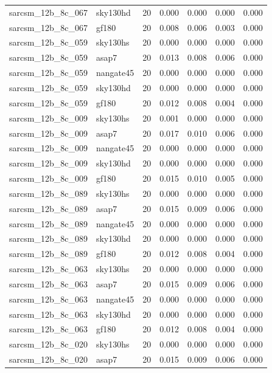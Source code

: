 \begin{tabular}{llrrrrr}
sarcsm\_12b\_8c\_067 & sky130hd & 20 & 0.000 & 0.000 & 0.000 & 0.000 \\
sarcsm\_12b\_8c\_067 & gf180 & 20 & 0.008 & 0.006 & 0.003 & 0.000 \\
sarcsm\_12b\_8c\_059 & sky130hs & 20 & 0.000 & 0.000 & 0.000 & 0.000 \\
sarcsm\_12b\_8c\_059 & asap7 & 20 & 0.013 & 0.008 & 0.006 & 0.000 \\
sarcsm\_12b\_8c\_059 & nangate45 & 20 & 0.000 & 0.000 & 0.000 & 0.000 \\
sarcsm\_12b\_8c\_059 & sky130hd & 20 & 0.000 & 0.000 & 0.000 & 0.000 \\
sarcsm\_12b\_8c\_059 & gf180 & 20 & 0.012 & 0.008 & 0.004 & 0.000 \\
sarcsm\_12b\_8c\_009 & sky130hs & 20 & 0.001 & 0.000 & 0.000 & 0.000 \\
sarcsm\_12b\_8c\_009 & asap7 & 20 & 0.017 & 0.010 & 0.006 & 0.000 \\
sarcsm\_12b\_8c\_009 & nangate45 & 20 & 0.000 & 0.000 & 0.000 & 0.000 \\
sarcsm\_12b\_8c\_009 & sky130hd & 20 & 0.000 & 0.000 & 0.000 & 0.000 \\
sarcsm\_12b\_8c\_009 & gf180 & 20 & 0.015 & 0.010 & 0.005 & 0.000 \\
sarcsm\_12b\_8c\_089 & sky130hs & 20 & 0.000 & 0.000 & 0.000 & 0.000 \\
sarcsm\_12b\_8c\_089 & asap7 & 20 & 0.015 & 0.009 & 0.006 & 0.000 \\
sarcsm\_12b\_8c\_089 & nangate45 & 20 & 0.000 & 0.000 & 0.000 & 0.000 \\
sarcsm\_12b\_8c\_089 & sky130hd & 20 & 0.000 & 0.000 & 0.000 & 0.000 \\
sarcsm\_12b\_8c\_089 & gf180 & 20 & 0.012 & 0.008 & 0.004 & 0.000 \\
sarcsm\_12b\_8c\_063 & sky130hs & 20 & 0.000 & 0.000 & 0.000 & 0.000 \\
sarcsm\_12b\_8c\_063 & asap7 & 20 & 0.015 & 0.009 & 0.006 & 0.000 \\
sarcsm\_12b\_8c\_063 & nangate45 & 20 & 0.000 & 0.000 & 0.000 & 0.000 \\
sarcsm\_12b\_8c\_063 & sky130hd & 20 & 0.000 & 0.000 & 0.000 & 0.000 \\
sarcsm\_12b\_8c\_063 & gf180 & 20 & 0.012 & 0.008 & 0.004 & 0.000 \\
sarcsm\_12b\_8c\_020 & sky130hs & 20 & 0.000 & 0.000 & 0.000 & 0.000 \\
sarcsm\_12b\_8c\_020 & asap7 & 20 & 0.015 & 0.009 & 0.006 & 0.000 \\

\end{tabular}
